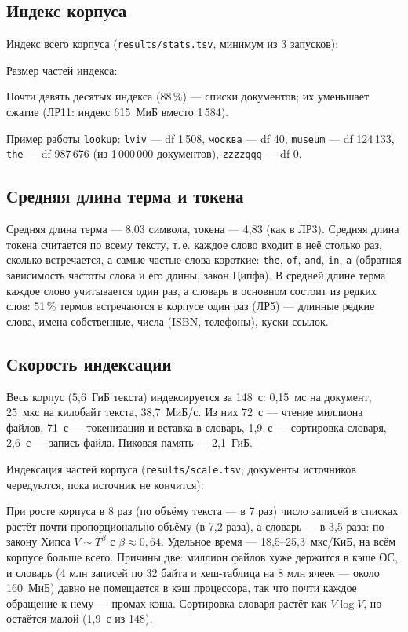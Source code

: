 {\scriptsize
{}
}

\subsection{Индекс корпуса}
Индекс всего корпуса (\texttt{results/stats.tsv}, минимум из 3 запусков):
\begin{center}
\small

\end{center}

Размер частей индекса:
\begin{center}
\small

\end{center}
Почти девять десятых индекса (88\,\%) --- списки документов; их уменьшает сжатие (ЛР11: индекс 615~МиБ вместо 1\,584).

Пример работы \texttt{lookup}: \texttt{lviv} --- df 1\,508, \texttt{москва} --- df 40, \texttt{museum} --- df 124\,133, \texttt{the} --- df 987\,676 (из 1\,000\,000 документов), \texttt{zzzzqqq} --- df 0.

\subsection{Средняя длина терма и токена}
Средняя длина терма --- 8,03 символа, токена --- 4,83 (как в ЛР3). Средняя длина токена считается по всему тексту, т.\,е. каждое слово входит в неё столько раз, сколько встречается, а самые частые слова короткие: \texttt{the}, \texttt{of}, \texttt{and}, \texttt{in}, \texttt{a} (обратная зависимость частоты слова и его длины, закон Ципфа). В средней длине терма каждое слово учитывается один раз, а словарь в основном состоит из редких слов: 51\,\% термов встречаются в корпусе один раз (ЛР5) --- длинные редкие слова, имена собственные, числа (ISBN, телефоны), куски ссылок.

\subsection{Скорость индексации}
Весь корпус (5,6~ГиБ текста) индексируется за 148~с: 0,15~мс на документ, 25~мкс на килобайт текста, 38,7~МиБ/с. Из них 72~с --- чтение миллиона файлов, 71~с --- токенизация и вставка в словарь, 1,9~с --- сортировка словаря, 2,6~с --- запись файла. Пиковая память --- 2,1~ГиБ.

Индексация частей корпуса (\texttt{results/scale.tsv}; документы источников чередуются, пока источник не кончится):
\begin{center}
\footnotesize
\setlength{\tabcolsep}{4pt}

\end{center}
При росте корпуса в 8 раз (по объёму текста --- в 7 раз) число записей в списках растёт почти пропорционально объёму (в 7,2 раза), а словарь --- в 3,5 раза: по закону Хипса $V \sim T^{\beta}$ с $\beta \approx 0{,}64$. Удельное время --- 18,5--25,3~мкс/КиБ, на всём корпусе больше всего. Причины две: миллион файлов хуже держится в кэше ОС, и словарь (4 млн записей по 32 байта и хеш-таблица на 8 млн ячеек --- около 160~МиБ) давно не помещается в кэш процессора, так что почти каждое обращение к нему --- промах кэша. Сортировка словаря растёт как $V \log V$, но остаётся малой (1,9~с из 148).

